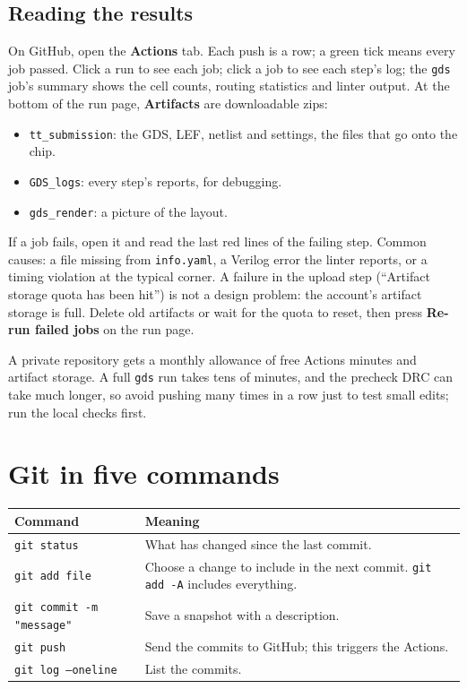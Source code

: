 \documentclass[11pt,a4paper]{article}
\newcommand{\file}[1]{\texttt{#1}}
\newcommand{\cmd}[1]{\texttt{#1}}
\begin{document}
\subsection{Reading the results}

On GitHub, open the \textbf{Actions} tab. Each push is a row; a green tick means every job passed. Click a run to see each job; click a job to see each step's log; the \texttt{gds} job's summary shows the cell counts, routing statistics and linter output. At the bottom of the run page, \textbf{Artifacts} are downloadable zips:
\begin{itemize}
\item \texttt{tt\_submission}: the GDS, LEF, netlist and settings, the files that go onto the chip.
\item \texttt{GDS\_logs}: every step's reports, for debugging.
\item \texttt{gds\_render}: a picture of the layout.
\end{itemize}

If a job fails, open it and read the last red lines of the failing step. Common causes: a file missing from \file{info.yaml}, a Verilog error the linter reports, or a timing violation at the typical corner. A failure in the upload step (``Artifact storage quota has been hit'') is not a design problem: the account's artifact storage is full. Delete old artifacts or wait for the quota to reset, then press \textbf{Re-run failed jobs} on the run page.

A private repository gets a monthly allowance of free Actions minutes and artifact storage. A full \cmd{gds} run takes tens of minutes, and the precheck DRC can take much longer, so avoid pushing many times in a row just to test small edits; run the local checks first.

\section{Git in five commands}

\begin{center}
\begin{tabularx}{\linewidth}{@{}lL@{}}
\toprule
Command & Meaning \\
\midrule
\cmd{git status} & What has changed since the last commit. \\
\cmd{git add file} & Choose a change to include in the next commit. \cmd{git add -A} includes everything. \\
\cmd{git commit -m "message"} & Save a snapshot with a description. \\
\cmd{git push} & Send the commits to GitHub; this triggers the Actions. \\
\cmd{git log --oneline} & List the commits. \\
\bottomrule
\end{tabularx}
\end{center}
\end{document}
